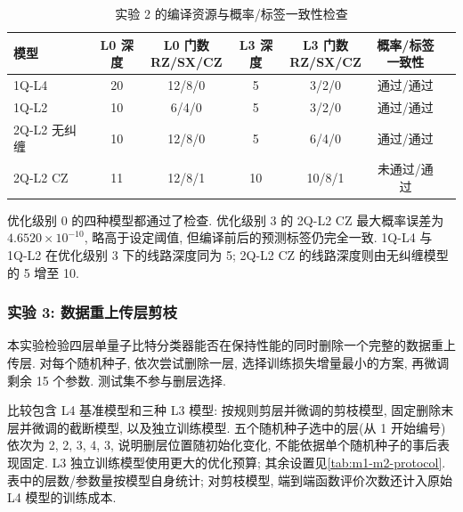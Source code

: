 \documentclass[a4paper]{ctexart}
\begin{document}
\begin{table}[H]
    \centering
    \caption{实验 2 的编译资源与概率/标签一致性检查}
    \renewcommand{\arraystretch}{1.2}
    \begin{tabular*}{\textwidth}{@{\extracolsep{\fill}}lcccccc@{}}
        \toprule
        模型 & L0 深度 & \shortstack{L0 门数\\RZ/SX/CZ} &
        L3 深度 & \shortstack{L3 门数\\RZ/SX/CZ} & \shortstack{概率/标签\\一致性} \\
        \midrule
        1Q-L4 & 20 & 12/8/0 & 5 & 3/2/0 & 通过/通过 \\
        1Q-L2 & 10 & 6/4/0 & 5 & 3/2/0 & 通过/通过 \\
        2Q-L2 无纠缠 & 10 & 12/8/0 & 5 & 6/4/0 & 通过/通过 \\
        2Q-L2 CZ & 11 & 12/8/1 & 10 & 10/8/1 & 未通过/通过 \\
        \bottomrule
    \end{tabular*}
\end{table}

优化级别 0 的四种模型都通过了检查. 优化级别 3 的 2Q-L2 CZ 最大概率误差为 $4.6520\times10^{-10}$, 略高于设定阈值, 但编译前后的预测标签仍完全一致. 1Q-L4 与 1Q-L2 在优化级别 3 下的线路深度同为 5; 2Q-L2 CZ 的线路深度则由无纠缠模型的 5 增至 10.

\subsubsection{实验 3: 数据重上传层剪枝}

本实验检验四层单量子比特分类器能否在保持性能的同时删除一个完整的数据重上传层. 对每个随机种子, 依次尝试删除一层, 选择训练损失增量最小的方案, 再微调剩余 15 个参数. 测试集不参与删层选择.

比较包含 L4 基准模型和三种 L3 模型: 按规则剪层并微调的剪枝模型, 固定删除末层并微调的截断模型, 以及独立训练模型. 五个随机种子选中的层(从 1 开始编号)依次为 2, 2, 3, 4, 3, 说明删层位置随初始化变化, 不能依据单个随机种子的事后表现固定. L3 独立训练模型使用更大的优化预算; 其余设置见\cref{tab:m1-m2-protocol}. 表中的层数/参数量按模型自身统计; 对剪枝模型, 端到端函数评价次数还计入原始 L4 模型的训练成本.
\end{document}
